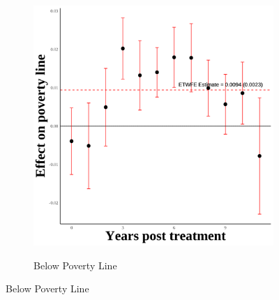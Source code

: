 \documentclass[12pt,english]{article}
\begin{document}
\begin{figure}[H]
\begin{subfigure}[b]{0.3\textwidth}
    \label{fig:snap-third-two}
  \end{subfigure}
  \hfill
  \begin{subfigure}[b]{0.3\textwidth}
    \centering
    \caption{Below Poverty Line}
    \includegraphics[width=\linewidth]{figures/plot70-poverty_line_event_study-third-two.png}
    \label{fig:poverty-line-third-two}
  \end{subfigure}

  \vspace{0.3cm} %


\end{figure}
\end{document}

